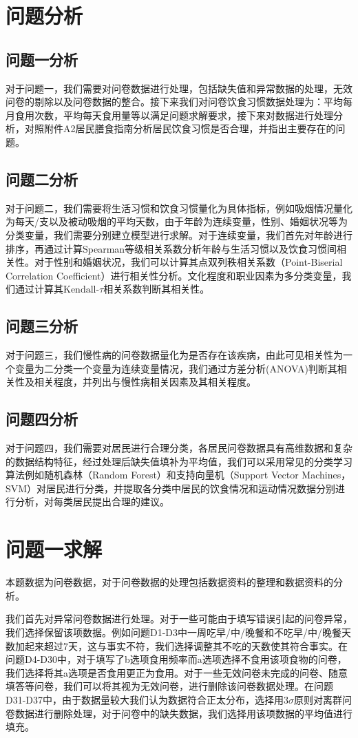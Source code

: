 \documentclass[withoutpreface,bwprint]{cumcmthesis} %
\begin{document}
\section{问题分析}

\subsection{问题一分析}
对于问题一，我们需要对问卷数据进行处理，包括缺失值和异常数据的处理，无效问卷的剔除以及问卷数据的整合。接下来我们对问卷饮食习惯数据处理为：平均每月食用次数，平均每天食用量等以满足问题求解要求，接下来对数据进行处理分析，对照附件A2居民膳食指南分析居民饮食习惯是否合理，并指出主要存在的问题。
\subsection{问题二分析}
对于问题二，我们需要将生活习惯和饮食习惯量化为具体指标，例如吸烟情况量化为每天/支以及被动吸烟的平均天数，由于年龄为连续变量，性别、婚姻状况等为分类变量，我们需要分别建立模型进行求解。对于连续变量，我们首先对年龄进行排序，再通过计算Spearman等级相关系数分析年龄与生活习惯以及饮食习惯间相关性。对于性别和婚姻状况，我们可以计算其点双列秩相关系数（Point-Biserial Correlation Coefficient）进行相关性分析。文化程度和职业因素为多分类变量，我们通过计算其$\text{Kendall-}\tau$相关系数判断其相关性。
\subsection{问题三分析}
对于问题三，我们慢性病的问卷数据量化为是否存在该疾病，由此可见相关性为一个变量为二分类一个变量为连续变量情况，我们通过方差分析(ANOVA)判断其相关性及相关程度，并列出与慢性病相关因素及其相关程度。
\subsection{问题四分析}
对于问题四，我们需要对居民进行合理分类，各居民问卷数据具有高维数据和复杂的数据结构特征，经过处理后缺失值填补为平均值，我们可以采用常见的分类学习算法例如随机森林（Random Forest）和支持向量机（Support Vector Machines，SVM）对居民进行分类，并提取各分类中居民的饮食情况和运动情况数据分别进行分析，对每类居民提出合理的建议。
\section{问题一求解}
本题数据为问卷数据，对于问卷数据的处理包括数据资料的整理和数据资料的分析。

我们首先对异常问卷数据进行处理。对于一些可能由于填写错误引起的问卷异常，我们选择保留该项数据。例如问题D1-D3中一周吃早/中/晚餐和不吃早/中/晚餐天数加起来超过7天，这与事实不符，我们选择调整其不吃的天数使其符合事实。在问题D4-D30中，对于填写了b选项食用频率而a选项选择不食用该项食物的问卷，我们选择将其a选项是否食用更正为食用。对于一些无效问卷未完成的问卷、随意填答等问卷，我们可以将其视为无效问卷，进行删除该问卷数据处理。在问题D31-D37中，由于数据量较大我们认为数据符合正太分布，选择用$3\sigma$原则对离群问卷数据进行删除处理，对于问卷中的缺失数据，我们选择用该项数据的平均值进行填充。
\end{document}
